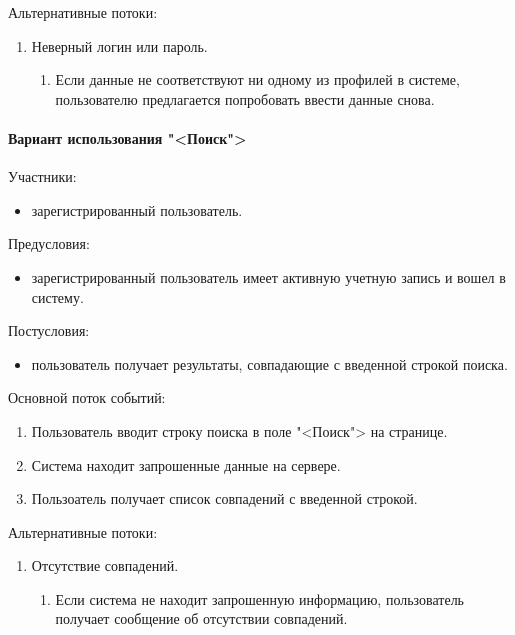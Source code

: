 Альтернативные потоки:
\begin{enumerate}
	\item Неверный логин или пароль.
	\begin{enumerate}
		\item Если данные не соответствуют ни одному из профилей в системе, пользователю предлагается попробовать ввести данные снова.
	\end{enumerate}
\end{enumerate}

\paragraph{Вариант использования "<Поиск">}

Участники:
\begin{itemize}
	\item зарегистрированный пользователь.
\end{itemize}

Предусловия:
\begin{itemize}
	\item зарегистрированный пользователь имеет активную учетную запись и вошел в систему.
\end{itemize}

Постусловия:
\begin{itemize}
	\item пользователь получает результаты, совпадающие с введенной строкой поиска.
\end{itemize}

Основной поток событий:
\begin{enumerate}
	\item Пользователь вводит строку поиска в поле "<Поиск"> на странице.
	\item Система находит запрошенные данные на сервере.
	\item Пользоатель получает список совпадений с введенной строкой.
\end{enumerate}

Альтернативные потоки:
\begin{enumerate}
	\item Отсутствие совпадений.
	\begin{enumerate}
		\item Если система не находит запрошенную информацию, пользователь получает сообщение об отсутствии совпадений.
	\end{enumerate}
\end{enumerate}

